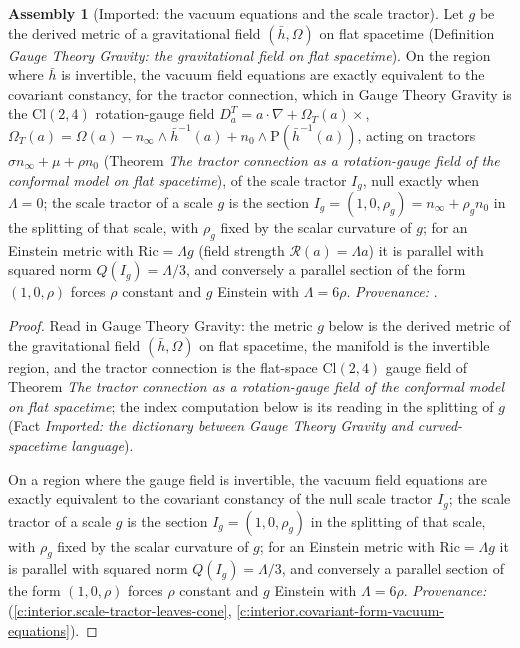 \documentclass[11pt]{article}
\theoremstyle{definition}
\newtheorem{assembled}[theorem]{Assembly}
\theoremstyle{plain}
\newcommand{\changedmark}[2]{\marginpar{\raggedright\scriptsize\color{#1}#2}}
\providecommand{\Cl}{}\renewcommand{\Cl}{\mathrm{Cl}}
\providecommand{\Sch}{}\renewcommand{\Sch}{\mathrm{P}}
\providecommand{\hb}{}\renewcommand{\hb}{\bar{h}}
\providecommand{\nInf}{}\renewcommand{\nInf}{n_\infty}
\providecommand{\nO}{}\renewcommand{\nO}{n_0}
\begin{document}
\begin{assembled}[Imported: the vacuum equations and the scale tractor]\label{c:correspondence.imported-vacuum-equations-scale-tractor}
\changedmark{gray}{reworded}
Let $g$ be the derived metric of a gravitational field $(\hb, \Omega)$ on flat spacetime (Definition \emph{Gauge Theory Gravity: the gravitational field on flat spacetime}). On the region where $\hb$ is invertible, the vacuum field equations are exactly equivalent to the covariant constancy, for the tractor connection, which in Gauge Theory Gravity is the $\Cl(2,4)$ rotation-gauge field $D^{T}_{a} = a \cdot \nabla + \Omega_{T}(a)\times$, $\Omega_{T}(a) = \Omega(a) - \nInf \wedge \hb^{-1}(a) + \nO \wedge \Sch(\hb^{-1}(a))$, acting on tractors $\sigma\nInf + \mu + \rho\nO$ (Theorem \emph{The tractor connection as a rotation-gauge field of the conformal model on flat spacetime}), of the scale tractor $I_g$, null exactly when $\Lambda = 0$; the scale tractor of a scale $g$ is the section $I_g = (1, 0, \rho_g) = \nInf + \rho_g\nO$ in the splitting of that scale, with $\rho_g$ fixed by the scalar curvature of $g$; for an Einstein metric with $\mathrm{Ric} = \Lambda g$ (field strength $\mathcal{R}(a) = \Lambda a$) it is parallel with squared norm $Q(I_g) = \Lambda/3$, and conversely a parallel section of the form $(1,0,\rho)$ forces $\rho$ constant and $g$ Einstein with $\Lambda = 6\rho$. \emph{Provenance:} \cite[Thm.~4.5, Thm.~4.7]{ButlerT6}.
\end{assembled}
\begin{proof}
Read in Gauge Theory Gravity: the metric $g$ below is the derived metric of the gravitational field $(\hb, \Omega)$ on flat spacetime, the manifold is the invertible region, and the tractor connection is the flat-space $\Cl(2,4)$ gauge field of Theorem \emph{The tractor connection as a rotation-gauge field of the conformal model on flat spacetime}; the index computation below is its reading in the splitting of $g$ (Fact \emph{Imported: the dictionary between Gauge Theory Gravity and curved-spacetime language}).

On a region where the gauge field is invertible, the vacuum field equations are exactly equivalent to the covariant constancy of the null scale tractor $I_g$; the scale tractor of a scale $g$ is the section $I_g = (1, 0, \rho_g)$ in the splitting of that scale, with $\rho_g$ fixed by the scalar curvature of $g$; for an Einstein metric with $\mathrm{Ric} = \Lambda g$ it is parallel with squared norm $Q(I_g) = \Lambda/3$, and conversely a parallel section of the form $(1,0,\rho)$ forces $\rho$ constant and $g$ Einstein with $\Lambda = 6\rho$. \emph{Provenance:} \cite[Thm.~4.5, Thm.~4.7]{ButlerT6} (\ref{c:interior.scale-tractor-leaves-cone}, \ref{c:interior.covariant-form-vacuum-equations}).

\end{proof}
\end{document}
